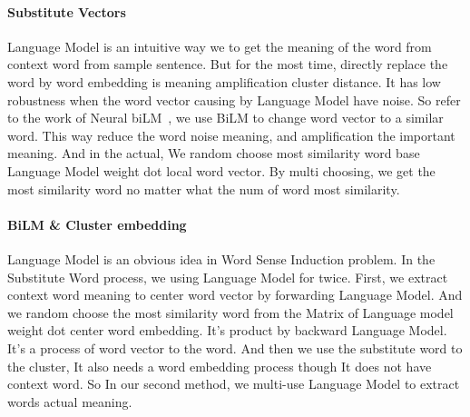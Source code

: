\paragraph{Substitute Vectors}
Language Model is an intuitive way we to get the meaning of the word from context word from sample sentence.
But for the most time, directly replace the word by word embedding is meaning amplification cluster distance.
It has low robustness when the word vector causing by Language Model have noise.
So refer to the work of Neural biLM~\cite{amrami-goldberg-2018-word}, we use BiLM to change word vector to a similar word.
This way reduce the word noise meaning, and amplification the important meaning.
And in the actual, We random choose most similarity word base Language Model weight dot local word vector.
By multi choosing, we get the most similarity word no matter what the num of word most similarity.

\paragraph{BiLM \& Cluster embedding}
Language Model is an obvious idea in Word Sense Induction problem.
In the Substitute Word process, we using Language Model for twice.
First, we extract context word meaning to center word vector by forwarding Language Model.
And we random choose the most similarity word from the Matrix of Language model weight dot center word embedding.
It's product by backward Language Model.
It's a process of word vector to the word.
And then we use the substitute word to the cluster, It also needs a word embedding process though It does not have context word.
So In our second method, we multi-use Language Model to extract words actual meaning.

